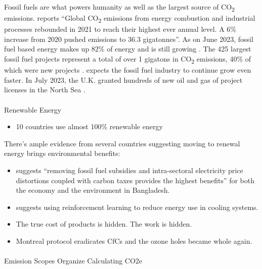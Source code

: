 \documentclass[
  letterpaper,
  DIV=11,
  numbers=noendperiod]{scrartcl}
\makeatletter
\let\oldparagraph\paragraph
\renewcommand{\paragraph}{
    \@ifstar
      \xxxParagraphStar
      \xxxParagraphNoStar
  }
\newcommand{\xxxParagraphStar}[1]{\oldparagraph*{#1}\mbox{}}
\newcommand{\xxxParagraphNoStar}[1]{\oldparagraph{#1}\mbox{}}
\providecommand{\tightlist}{%
  \setlength{\itemsep}{0pt}\setlength{\parskip}{0pt}}\usepackage{longtable,booktabs,array}
\makeatother
\begin{document}
Fossil fuels are what powers humanity as well as the largest source of
CO\textsubscript{2} emissions. \citet{ieaGlobalEnergyReview2022} reports
``Global CO\textsubscript{2} emissions from energy combustion and
industrial processes rebounded in 2021 to reach their highest ever
annual level. A 6\% increase from 2020 pushed emissions to 36.3
gigatonnes''. As on June 2023, fossil fuel based energy makes up 82\% of
energy and is still growing \citet{instituteEnergySystemStruggles2023}.
The 425 largest fossil fuel projects represent a total of over 1
gigatons in CO\textsubscript{2} emissions, 40\% of which were new
projects \citet{kuhneCarbonBombsMapping2022}.
\citet{tilstedEndingFossilbasedGrowth2023} expects the fossil fuel
industry to continue grow even faster. In July 2023, the U.K. granted
hundreds of new oil and gas of project licenses in the North Sea
\citep{RishiSunakGreenlight2023}.

\paragraph{Renewable Energy}\label{renewable-energy}

\begin{itemize}
\tightlist
\item
  10 countries use almost 100\% renewable energy
\end{itemize}

There's ample evidence from several countries suggesting moving to
renewal energy brings environmental benefits:

\begin{itemize}
\item
  \citet{AMIN2022113224} suggests ``removing fossil fuel subsidies and
  intra-sectoral electricity price distortions coupled with carbon taxes
  provides the highest benefits'' for both the economy and the
  environment in Bangladesh.
\item
  \citet{luoControllingCommercialCooling2022} suggests using
  reinforcement learning to reduce energy use in cooling systems.
\item
  The true cost of products is hidden. The work is hidden.
\item
  Montreal protocol eradicates CfCs and the ozone holes became whole
  again.
\end{itemize}

\paragraph{Emission Scopes Organize Calculating
CO2e}\label{emission-scopes-organize-calculating-co2e}
\end{document}
